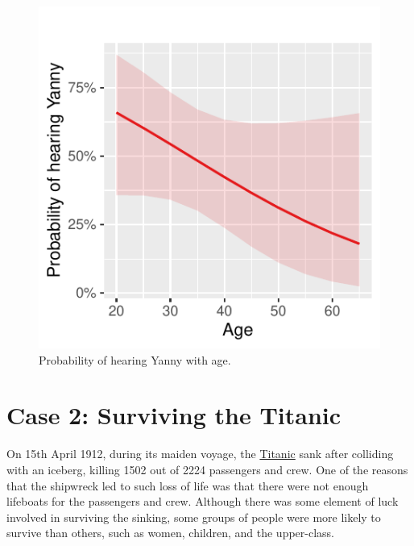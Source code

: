 \documentclass[
  letterpaper,
  DIV=11,
  numbers=noendperiod]{scrartcl}
\begin{document}
\begin{tcolorbox}
\begin{figure}[H]
{\centering \includegraphics{about_files/figure-pdf/unnamed-chunk-8-1.pdf}

}

\caption{Probability of hearing Yanny with age.}

\end{figure}%

\end{tcolorbox}

\section{Case 2: Surviving the
Titanic}\label{case-2-surviving-the-titanic}

On 15th April 1912, during its maiden voyage, the
\href{https://en.wikipedia.org/wiki/RMS_Titanic}{Titanic} sank after
colliding with an iceberg, killing 1502 out of 2224 passengers and crew.
One of the reasons that the shipwreck led to such loss of life was that
there were not enough lifeboats for the passengers and crew. Although
there was some element of luck involved in surviving the sinking, some
groups of people were more likely to survive than others, such as women,
children, and the upper-class.
\end{document}

